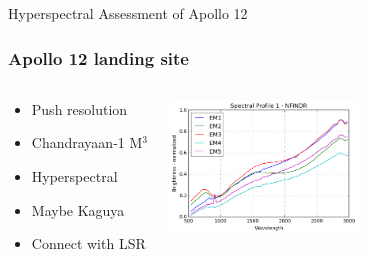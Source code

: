 \documentclass[serif,mathserif]{beamer}
\begin{document}
{
\begin{frame}[plain]
\begin{shaded}
Hyperspectral Assessment of Apollo 12
\end{shaded}
\end{frame}}


\begin{frame}
  \frametitle{Apollo 12 landing site}
\begin{columns}
\begin{center}
\begin{itemize}
 \item Push resolution
 \item Chandrayaan-1 M$^3$
 \item Hyperspectral
 \item Maybe Kaguya
 \item Connect with LSR
\end{itemize}
\end{center}

\begin{center}
 \includegraphics[width=5cm]{Moon_A12_Medium_EM1_to_EM5.png}
\end{center}
\end{columns}
\end{frame}
\end{document}
